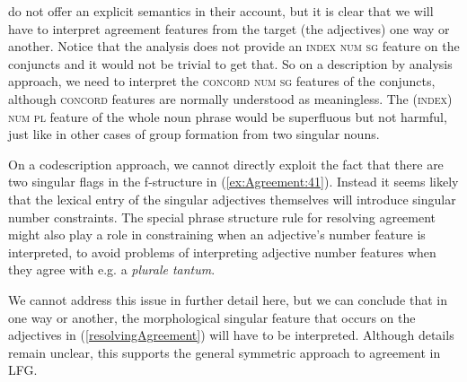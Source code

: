 \documentclass[output=paper,hidelinks]{langscibook}
\begin{document}
\citet{belyaev-etal2015} do not offer an explicit semantics in their account,
but it is clear that we will have to interpret agreement features from
the target (the adjectives) one way or another. Notice that the
analysis does not provide an \textsc{index num sg} feature on the
conjuncts and it would not be trivial to get that. So on a description
by analysis approach, we need to interpret the \textsc{concord num sg}
features of the conjuncts, although \textsc{concord} features are
normally understood as meaningless. The (\textsc{index}) \textsc{num
  pl} feature of the whole noun phrase would be superfluous but not
harmful, just like in other cases of group formation from two singular
nouns.

On a codescription approach, we cannot directly exploit the fact that there are
two singular flags in the f-structure in (\ref{ex:Agreement:41}). Instead it seems
likely that the lexical entry of the singular adjectives themselves
will introduce singular number constraints. The special phrase
structure rule for resolving agreement might also play a role in
constraining when an adjective's number feature is interpreted, to avoid
problems of interpreting adjective number features when they agree
with e.g. a \textit{plurale tantum}.

We cannot address this issue in further detail here, but we can
conclude that in one way or another, the morphological singular
feature that occurs on the adjectives in (\ref{resolvingAgreement}) will have
to be interpreted. Although details remain unclear, this supports the
general symmetric approach to agreement in LFG.
\end{document}
